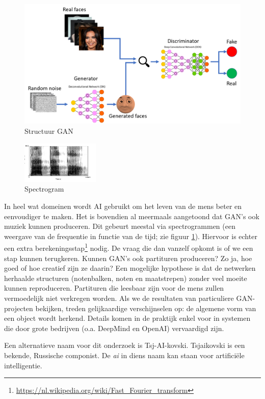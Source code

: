 \documentclass[dutch, twoside, a4paper, 10pt]{article}
\begin{document}
\begin{figure}[h!]
    \centering
    \includegraphics[scale=0.25]{GAN_en.png}
    \caption{Structuur GAN}
\end{figure}

\begin{figure}
    \vspace{-\baselineskip}
    \centering
    \includegraphics[width=0.33\textwidth, trim={2 0 0 0}, clip]{Praat-spectrogram-tatata.png}
    \caption{Spectrogram}
    \label{fig:Spectrogram}
    
    \vspace{-3\baselineskip}
\end{figure}
\noindent
In heel wat domeinen wordt AI gebruikt om het leven van de mens beter en eenvoudiger te maken. Het is bovendien al meermaals aangetoond dat GAN's ook muziek kunnen produceren. Dit gebeurt meestal via spectrogrammen (een weergave van de frequentie in functie van de tijd; zie figuur \ref{fig:Spectrogram}). Hiervoor is echter een extra berekeningsstap\footnote{\url{https://nl.wikipedia.org/wiki/Fast_Fourier_transform}} nodig. De vraag die dan vanzelf opkomt is of we een stap kunnen terugkeren. Kunnen GAN's ook partituren produceren? Zo ja, hoe goed of hoe creatief zijn ze daarin? Een mogelijke hypothese is dat de netwerken herhaalde structuren (notenbalken, noten en maatstrepen) zonder veel moeite kunnen reproduceren. Partituren die leesbaar zijn voor de mens zullen vermoedelijk niet verkregen worden. Als we de resultaten van particuliere GAN-projecten bekijken, treden gelijkaardige verschijnselen op: de algemene vorm van een object wordt herkend. Details komen in de praktijk enkel voor in systemen die door grote bedrijven (o.a. DeepMind en OpenAI) vervaardigd zijn. 
\par\bigskip\noindent
Een alternatieve naam voor dit onderzoek is Tsj-AI-kovski. Tsjaikovski is een bekende, Russische componist. De \textit{ai} in diens naam kan staan voor artificiële intelligentie.
\end{document}

